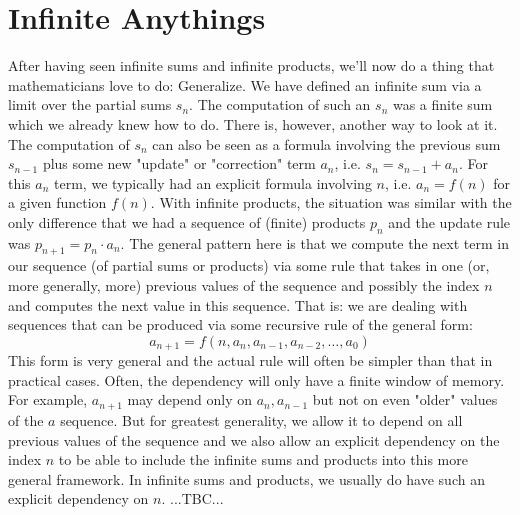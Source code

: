 \section{Infinite Anythings}
After having seen infinite sums and infinite products, we'll now do a thing that mathematicians love to do: Generalize. We have defined an infinite sum via a limit over the partial sums $s_n$. The computation of such an $s_n$ was a finite sum which we already knew how to do. There is, however, another way to look at it. The computation of $s_n$ can also be seen as a formula involving the previous sum $s_{n-1}$ plus some new "update" or "correction" term $a_n$, i.e. $s_n = s_{n-1} + a_n$. For this $a_n$ term, we typically had an explicit formula involving $n$, i.e. $a_n = f(n)$ for a given function $f(n)$. With infinite products, the situation was similar with the only difference that we had a sequence of (finite) products $p_n$ and the update rule was $p_{n+1} = p_n \cdot a_n$. The general pattern here is that we compute the next term in our sequence (of partial sums or products) via some rule that takes in one (or, more generally, more) previous values of the sequence and possibly the index $n$ and computes the next value in this sequence. That is: we are dealing with sequences that can be produced via some recursive rule of the general form:
\begin{equation}
a_{n+1} = f(n, a_n, a_{n-1}, a_{n-2}, \ldots, a_0)
\end{equation}
This form is very general and the actual rule will often be simpler than that in practical cases. Often, the dependency will only have a finite window of memory. For example, $a_{n+1}$ may depend only on $a_n, a_{n-1}$ but not on even "older" values of the $a$ sequence. But for greatest generality, we allow it to depend on all previous values of the sequence and we also allow an explicit dependency on the index $n$ to be able to include the infinite sums and products into this more general framework. In infinite sums and products, we usually do have such an explicit dependency on $n$. ...TBC...

%
%

